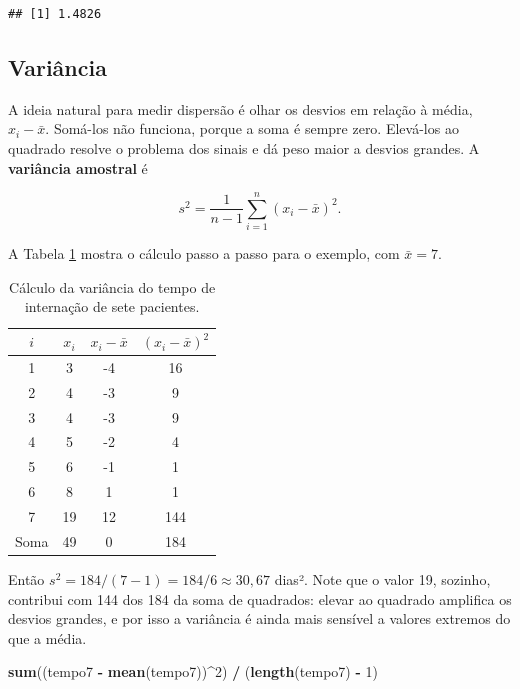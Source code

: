 \documentclass[
]{book}
\newenvironment{Shaded}{\begin{snugshade}}{\end{snugshade}}
\newcommand{\DecValTok}[1]{\textcolor[rgb]{0.00,0.00,0.81}{#1}}
\newcommand{\FunctionTok}[1]{\textcolor[rgb]{0.13,0.29,0.53}{\textbf{#1}}}
\newcommand{\NormalTok}[1]{#1}
\newcommand{\SpecialCharTok}[1]{\textcolor[rgb]{0.81,0.36,0.00}{\textbf{#1}}}
\begin{document}
\begin{verbatim}
## [1] 1.4826
\end{verbatim}

\subsection{Variância}\label{variuxe2ncia}

A ideia natural para medir dispersão é olhar os desvios em relação à média, \(x_i - \bar{x}\). Somá-los não funciona, porque a soma é sempre zero. Elevá-los ao quadrado resolve o problema dos sinais e dá peso maior a desvios grandes. A \textbf{variância amostral} é

\begin{equation}
s^2 = \frac{1}{n-1}\sum_{i=1}^{n}(x_i - \bar{x})^2 .
\label{eq:variancia}
\end{equation}

A Tabela \ref{tab:desc-tab-desvios} mostra o cálculo passo a passo para o exemplo, com \(\bar{x} = 7\).

\begin{table}

\caption{\label{tab:desc-tab-desvios}Cálculo da variância do tempo de internação de sete pacientes.}
\centering
\begin{tabular}[t]{c|c|c|c}
\hline
$i$ & $x_i$ & $x_i - \bar{x}$ & $(x_i - \bar{x})^2$\\
\hline
1 & 3 & -4 & 16\\
\hline
2 & 4 & -3 & 9\\
\hline
3 & 4 & -3 & 9\\
\hline
4 & 5 & -2 & 4\\
\hline
5 & 6 & -1 & 1\\
\hline
6 & 8 & 1 & 1\\
\hline
7 & 19 & 12 & 144\\
\hline
Soma & 49 & 0 & 184\\
\hline
\end{tabular}
\end{table}

Então \(s^2 = 184/(7 - 1) = 184/6 \approx 30{,}67\) dias². Note que o valor 19, sozinho, contribui com 144 dos 184 da soma de quadrados: elevar ao quadrado amplifica os desvios grandes, e por isso a variância é ainda mais sensível a valores extremos do que a média.

\begin{Shaded}
\begin{Highlighting}[]
\FunctionTok{sum}\NormalTok{((tempo7 }\SpecialCharTok{{-}} \FunctionTok{mean}\NormalTok{(tempo7))}\SpecialCharTok{\^{}}\DecValTok{2}\NormalTok{) }\SpecialCharTok{/}\NormalTok{ (}\FunctionTok{length}\NormalTok{(tempo7) }\SpecialCharTok{{-}} \DecValTok{1}\NormalTok{)}
\end{Highlighting}
\end{Shaded}
\end{document}
